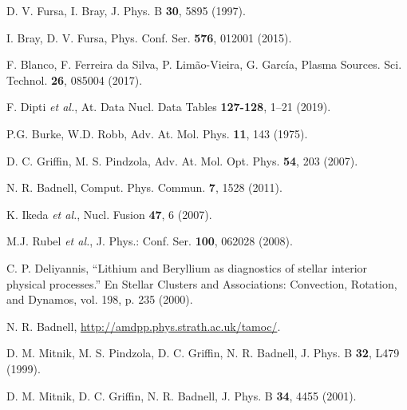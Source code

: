 \begin{thebibliography}{9}
D. V. Fursa, I. Bray, 
J. Phys. B \textbf{30}, 5895 (1997).

I. Bray, D. V. Fursa, 
Phys. Conf. Ser. \textbf{576}, 012001 (2015).

F. Blanco, F. Ferreira da Silva, P. Lim\~ao-Vieira, G. García, 
Plasma Sources. Sci. Technol. \textbf{26}, 085004 (2017).

F. Dipti \textit{et al.}, %
‎At. Data Nucl. Data Tables \textbf{127-128}, 1--21 (2019).

P.G. Burke, W.D. Robb, 
Adv. At. Mol. Phys. \textbf{11}, 143 (1975).

D. C. Griffin, M. S. Pindzola,
Adv. At. Mol. Opt. Phys. \textbf{54}, 203 (2007).

N. R. Badnell, 
Comput. Phys. Commun. \textbf{7}, 1528 (2011).

K. Ikeda \textit{et al.},
Nucl. Fusion \textbf{47}, 6 (2007).

M.J. Rubel \textit{et al.},
J. Phys.: Conf. Ser. \textbf{100}, 062028 (2008).

C. P. Deliyannis, 
``Lithium and Beryllium as diagnostics of stellar interior physical 
processes.'' En Stellar Clusters and Associations: Convection, Rotation, 
and Dynamos, vol. 198, p. 235 (2000).

N. R. Badnell,
\url{http://amdpp.phys.strath.ac.uk/tamoc/}.



D. M. Mitnik, M. S. Pindzola, D. C. Griffin, N. R. Badnell, 
J. Phys. B \textbf{32}, L479 (1999).

D. M. Mitnik, D. C. Griffin, N. R. Badnell, 
J. Phys. B \textbf{34}, 4455 (2001).


\end{thebibliography}
